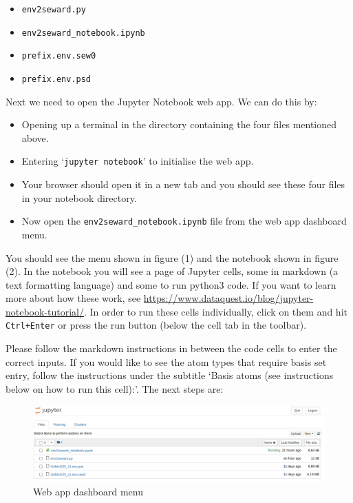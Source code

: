 \begin{itemize}
	\item \texttt{env2seward.py}
	\item \texttt{env2seward\_notebook.ipynb}
	\item \texttt{prefix.env.sew0}
	\item \texttt{prefix.env.psd}
\end{itemize}
Next we need to open the Jupyter Notebook web app. We can do this by:

\begin{itemize}
	\item Opening up a terminal in the directory containing the four files mentioned above.
	\item Entering `\texttt{jupyter notebook}' to initialise the web app.
	\item Your browser should open it in a new tab and you should see these four files in your notebook directory.
	\item Now open the \texttt{env2seward\_notebook.ipynb} file from the web app dashboard menu.
\end{itemize}

You should see the menu shown in figure (1) and the notebook shown in figure (2). In the notebook you will see a page of Jupyter cells, some in markdown (a text formatting language) and some to run python3 code. If you want to learn more about how these work, see \url{https://www.dataquest.io/blog/jupyter-notebook-tutorial/}. In order to run these cells individually, click on them and hit \texttt{Ctrl+Enter} or press the run button (below the cell tab in the toolbar).

Please follow the markdown instructions in between the code cells to enter the correct inputs. If you would like to see the atom types that require basis set entry, follow the instructions under the subtitle `Basis atoms (see instructions below on how to run this cell):'. The next steps are:

\begin{figure}
	\centering
	\includegraphics[width=1.3\linewidth]{../manuals/e2s_disp_manual/dashboard.png}
	\caption{Web app dashboard menu}
	\label{fig:screenshot-from-2020-06-23-12-26-13}
\end{figure}

